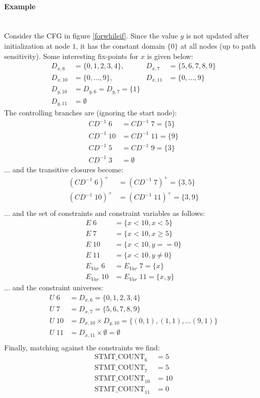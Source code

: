 \documentclass[a4paper]{article}
\newcommand{\NL}[0]{ \hfill\\\noindent }
\begin{document}
\paragraph{Example}\NL
Consider the CFG in figure \ref{forwhileif}. Since the value $y$ is not updated after initialization at node $1$, it has the constant domain $\{0\}$ at all nodes (up to path sensitivity). Some interesting fix-points for $x$ is given below:
\begin{align*}
D_{x,6}  &= \{0,1,2,3,4\},    &D_{x,7}  &= \{5,6,7,8,9\}\\
D_{x,10} &= \{0, \ldots, 9\}, &D_{x,11} &= \{0, \ldots, 9\} \\
D_{y,10} &= D_{y,6} = D_{y,7} = \{1\}\\
D_{y,11} &= \emptyset 
\end{align*}
\noindent
The controlling branches are (ignoring the start node):
\begin{align*}
CD^{-1}\;6  &= CD^{-1}\;7  = \{5\} \\
CD^{-1}\;10 &= CD^{-1}\;11 = \{9\} \\
CD^{-1}\;5 &= CD^{-1}\;9 = \{3\}\\
CD^{-1}\;3 &= \emptyset 
\end{align*}
\noindent
... and the transitive closures become:
\begin{align*}
(CD^{-1}\;6)^+  &= (CD^{-1}\;7)^+  = \{3,5\} \\
(CD^{-1}\;10)^+ &= (CD^{-1}\;11)^+ = \{3,9\} \\
\end{align*}
\noindent
... and the set of constraints and constraint variables as follows:
\begin{align*}
E\;6  &= \{x < 10, x < 5\}\\
E\;7  &= \{x < 10, x \geq 5\}\\
E\;10 &= \{x < 10, y == 0\}\\
E\;11 &= \{x < 10, y \neq 0\}\\
E_{Var}\;6  &= E_{Var}\;7  = \{x\}\\
E_{Var}\;10 &= E_{Var}\;11 = \{x, y\}
\end{align*}
\noindent
...  and the constraint universes:
\begin{align*}
U\;6  &= D_{x,6} = \{0,1,2,3,4\}\\
U\;7  &= D_{x,7} = \{5,6,7,8,9\}\\
U\;10  &= D_{x,10} \times D_{y,10} = \{(0,1),(1,1), \ldots (9,1)\}\\
U\;11  &= D_{x,11} \times \emptyset = \emptyset\\
\end{align*}
\noindent
Finally, matching against the constraints we find:
\begin{align*}
\text{STMT\_COUNT}_6    &= 5\\
\text{STMT\_COUNT}_7    &= 5\\
\text{STMT\_COUNT}_{10} &= 10\\
\text{STMT\_COUNT}_{11} &= 0
\end{align*}
\end{document}
